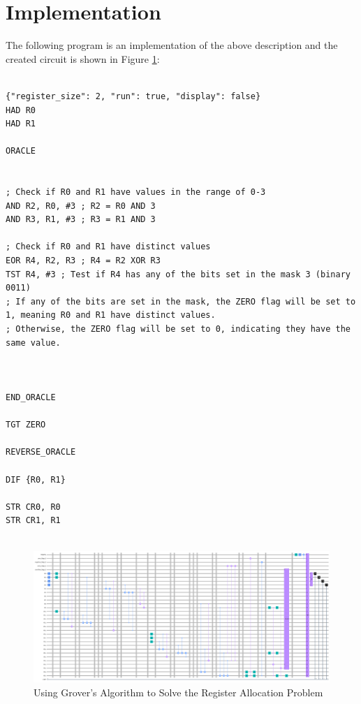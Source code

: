 \section{Implementation}

The following program is an implementation of the above description and the created circuit is shown in Figure \ref{fig:Register_Allocation}:

\begin{lstlisting}

{"register_size": 2, "run": true, "display": false}
HAD R0
HAD R1

ORACLE


; Check if R0 and R1 have values in the range of 0-3
AND R2, R0, #3 ; R2 = R0 AND 3
AND R3, R1, #3 ; R3 = R1 AND 3

; Check if R0 and R1 have distinct values
EOR R4, R2, R3 ; R4 = R2 XOR R3
TST R4, #3 ; Test if R4 has any of the bits set in the mask 3 (binary 0011)
; If any of the bits are set in the mask, the ZERO flag will be set to 1, meaning R0 and R1 have distinct values.
; Otherwise, the ZERO flag will be set to 0, indicating they have the same value.



END_ORACLE

TGT ZERO

REVERSE_ORACLE

DIF {R0, R1}

STR CR0, R0
STR CR1, R1


\end{lstlisting}

\begin{figure}[htp]
    \centering
    \includegraphics[width=18cm]{Figures/Register_Allocation_circuit.png}
    \caption{Using Grover's Algorithm to Solve the Register Allocation Problem}
    \label{fig:Register_Allocation}
\end{figure}


